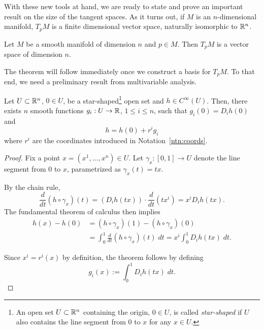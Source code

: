 With these new tools at hand, we are ready to state and prove an important result on the size of the tangent spaces.
As it turns out, if $M$ is an $n$-dimensional manifold, $T_pM$ is a finite dimensional vector space, naturally isomorphic to $\mathbb{R}^n$.

\begin{theorem}\label{thm:dimensionTpM}
  Let $M$ be a smooth manifold of dimension $n$ and $p\in M$.
  Then $T_pM$ is a vector space of dimension $n$.
\end{theorem}

The theorem will follow immediately once we construct a basis for $T_pM$.
To that end, we need a preliminary result from multivariable analysis.

\begin{lemma}\label{lem:Taylor}
  Let $U\subset\mathbb{R}^n$, $0\in U$, be a star-shaped\footnote{An open set $U\subset\mathbb{R}^n$ containing the origin, $0\in U$, is called \emph{star-shaped} if $U$ also contains the line segment from $0$ to $x$ for any $x\in U$.} open set and $h\in C^\infty(U)$.
  Then, there exists $n$ smooth functions $g_i: U \to \mathbb{R}$, $1\leq i \leq n$, such that $g_i(0) = D_i h(0)$ and
  \begin{equation}
    h = h(0) + r^i g_i
  \end{equation}
  where $r^i$ are the coordinates introduced in Notation~\ref{ntn:coords}.
\end{lemma}
\begin{proof}
  Fix a point $x = (x^1, \ldots, x^n) \in U$.
  Let $\gamma_x:[0,1]\to U$ denote the line segment from $0$ to $x$, parametrized as $\gamma_x(t) = tx$.

  By the chain rule,
  \begin{equation}
    \frac{d}{dt}(h \circ \gamma_x) (t) = \left(D_i h(t x)\right) \cdot \frac{d}{dt} (t x^i) = x^i D_i h(t x).
  \end{equation}
  The fundamental theorem of calculus then implies
  \begin{align}
    h(x) - h(0) & = (h \circ \gamma_x)(1) - (h \circ \gamma_x)(0)                                 \\
                & = \int_0^1 \frac{d}{dt}(h \circ \gamma_x)(t)\;dt = x^i \int_0^1 D_i h(tx)\; dt.
  \end{align}

  Since $x^i = r^i(x)$ by definition, the theorem follows by defining
  \begin{equation}
    g_i(x) := \int_0^1 D_i h(tx)\; dt.
  \end{equation}
\end{proof}

